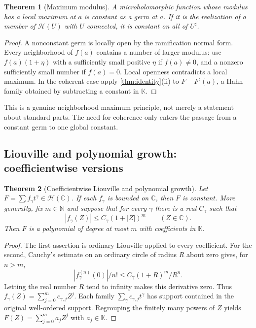 \documentclass[11pt,letterpaper]{article}
\numberwithin{equation}{section}
\newtheorem{theorem}{Theorem}[section]
\theoremstyle{definition}
\theoremstyle{remark}
\newcommand{\K}{\mathbb K}
\newcommand{\C}{\mathbb C}
\newcommand{\N}{\mathbb N}
\newcommand{\HH}{\mathscr H}
\begin{document}
\begin{theorem}[Maximum modulus]
A microholomorphic function whose modulus has a local maximum at $a$
is constant as a germ at $a$. If it is the realization of a member of
$\HH(U)$ with $U$ connected, it is constant on all of $U^\sharp$.
\end{theorem}
\begin{proof}
A nonconstant germ is locally open by the ramification normal form.
Every neighborhood of $f(a)$ contains a number of larger modulus:
use $f(a)(1+\eta)$ with a sufficiently small positive $\eta$ if
$f(a)\ne0$, and a nonzero sufficiently small number if $f(a)=0$.
Local openness contradicts a local maximum. In the coherent case apply
\cref{thm:identity}(ii) to $F-F^\sharp(a)$, a Hahn family obtained by
subtracting a constant in $\K$.
\end{proof}

This is a genuine neighborhood maximum principle, not merely a statement
about standard parts. The need for coherence only enters the passage
from a constant germ to one global constant.

\subsection{Liouville and polynomial growth: coefficientwise versions}

\begin{theorem}[Coefficientwise Liouville and polynomial growth]
Let $F=\sum f_\gamma t^\gamma\in\HH(\C)$.
If each $f_\gamma$ is bounded on $\C$, then $F$ is constant.
More generally, fix $m\in\N$ and suppose that for every $\gamma$ there
is a real $C_\gamma$ such that
\[
 |f_\gamma(Z)|\le C_\gamma(1+|Z|)^m\qquad(Z\in\C).
\]
Then $F$ is a polynomial of degree at most $m$ with coefficients in $\K$.
\end{theorem}
\begin{proof}
The first assertion is ordinary Liouville applied to every coefficient.
For the second, Cauchy's estimate on an ordinary circle of radius $R$
about zero gives, for $n>m$,
\[
 |f_\gamma^{(n)}(0)|/n!
 \le C_\gamma(1+R)^m/R^n.
\]
Letting the real number $R$ tend to infinity makes this derivative zero.
Thus $f_\gamma(Z)=\sum_{j=0}^m c_{\gamma,j}Z^j$. Each family
$\sum_\gamma c_{\gamma,j}t^\gamma$ has support contained in the original
well-ordered support. Regrouping the finitely many powers of $Z$ yields
$F(Z)=\sum_{j=0}^m a_j Z^j$ with $a_j\in\K$.
\end{proof}
\end{document}
